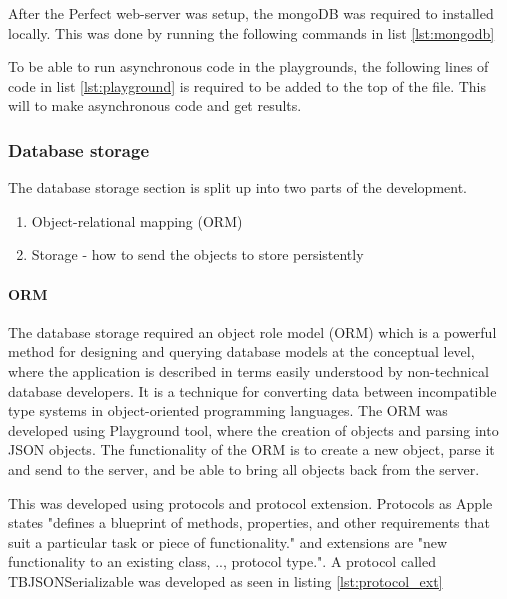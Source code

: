 After the Perfect web-server was setup, the mongoDB was required to installed locally. This was done by running the following commands in list \ref{lst:mongodb}






To be able to run asynchronous code in the playgrounds, the following lines of code in list \ref{lst:playground} is required to be added to the top of the file. This will to make asynchronous code and get results.

\subsubsection{Database storage}

The database storage section is split up into two parts of the development. 

\begin{enumerate}
  \item Object-relational mapping (ORM)
  \item Storage - how to send the objects to store persistently
\end{enumerate}

\paragraph{ORM}

The database storage required an object role model (ORM) which is a powerful method for designing and querying database models at the conceptual level, where the application is described in terms easily understood by non-technical database developers. It is a technique for converting data between incompatible type systems in object-oriented programming languages. The ORM was developed using Playground tool, where the creation of objects and parsing into JSON objects. The functionality of the ORM is to create a new object, parse it and send to the server, and be able to bring all objects back from the server.

This was developed using protocols and protocol extension. Protocols as Apple states "defines a blueprint of methods, properties, and other requirements that suit a particular task or piece of functionality." and extensions are "new functionality to an existing class, .., protocol type.". \cite{protocol} A protocol called TBJSONSerializable was developed as seen in listing \ref{lst:protocol_ext}


